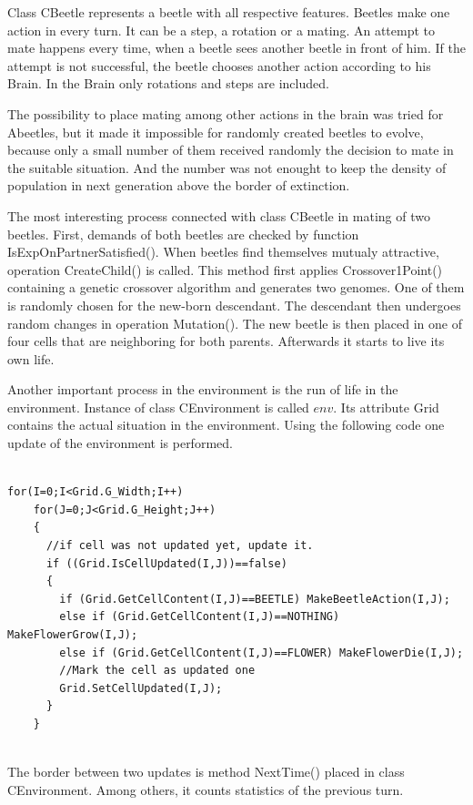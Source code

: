 \documentclass[a4paper,12pt]{report}
\begin{document}
Class CBeetle represents a beetle with all respective features. Beetles make one action in every turn. It can be a step, a rotation or a mating. An attempt to mate happens every time, when a beetle sees another beetle in front of him. If the attempt is not successful, the beetle chooses another action according to his Brain. In the Brain only rotations and steps are included.

The possibility to place mating among other actions in the brain was tried for Abeetles, but it made it impossible for randomly created beetles to evolve, because only a small number of them received randomly the decision to mate in the suitable situation. And the number was not enought to keep the density of population in next generation above the border of extinction.

The most interesting process connected with class CBeetle in mating of two beetles. First, demands of both beetles are checked by function IsExpOnPartnerSatisfied(). When beetles find themselves mutualy attractive,  operation CreateChild() is called. This method first applies Crossover1Point() containing a genetic crossover algorithm and generates two genomes. One of them is randomly chosen for the new-born descendant. The descendant then undergoes random changes in operation Mutation(). The new beetle is then placed in one of four cells that are neighboring for both parents. Afterwards it starts to live its own life.

Another important process in the environment is the run of life in the environment. Instance of class CEnvironment is called $env$. Its attribute Grid   contains the actual situation in the environment. Using the following code one update of the environment is performed.

\begin{verbatim}

for(I=0;I<Grid.G_Width;I++)
    for(J=0;J<Grid.G_Height;J++)
    {
      //if cell was not updated yet, update it.
      if ((Grid.IsCellUpdated(I,J))==false)
      {
        if (Grid.GetCellContent(I,J)==BEETLE) MakeBeetleAction(I,J);
        else if (Grid.GetCellContent(I,J)==NOTHING) MakeFlowerGrow(I,J);
        else if (Grid.GetCellContent(I,J)==FLOWER) MakeFlowerDie(I,J);
        //Mark the cell as updated one
        Grid.SetCellUpdated(I,J); 
      }
    }
		
\end{verbatim}		

The border between two updates is method NextTime() placed in class CEnvironment. Among others, it counts statistics of the previous turn.
\end{document}
